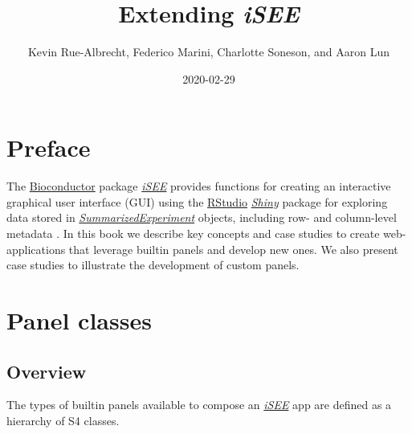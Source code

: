 \documentclass[]{book}
\title{Extending \emph{iSEE}}
\author{Kevin Rue-Albrecht, Federico Marini, Charlotte Soneson, and Aaron Lun}
\date{2020-02-29}
\begin{document}
\maketitle

{
\setcounter{tocdepth}{1}
\tableofcontents
}
\chapter*{Preface}\label{preface}

The \href{https://bioconductor.org/}{Bioconductor} package
\emph{\href{https://bioconductor.org/packages/3.11/iSEE}{iSEE}} provides
functions for creating an interactive graphical user interface (GUI)
using the \href{https://rstudio.com/}{RStudio}
\emph{\href{https://CRAN.R-project.org/package=Shiny}{Shiny}} package
for exploring data stored in
\emph{\href{https://bioconductor.org/packages/3.11/SummarizedExperiment}{SummarizedExperiment}}
objects, including row- and column-level metadata \citep{rue2018isee}.
In this book we describe key concepts and case studies to create
web-applications that leverage builtin panels and develop new ones. We
also present case studies to illustrate the development of custom
panels.

\hypertarget{panels}{\chapter{Panel classes}\label{panels}}

\section{Overview}\label{overview}

The types of builtin panels available to compose an
\emph{\href{https://bioconductor.org/packages/3.11/iSEE}{iSEE}} app are
defined as a hierarchy of S4 classes.
\end{document}
